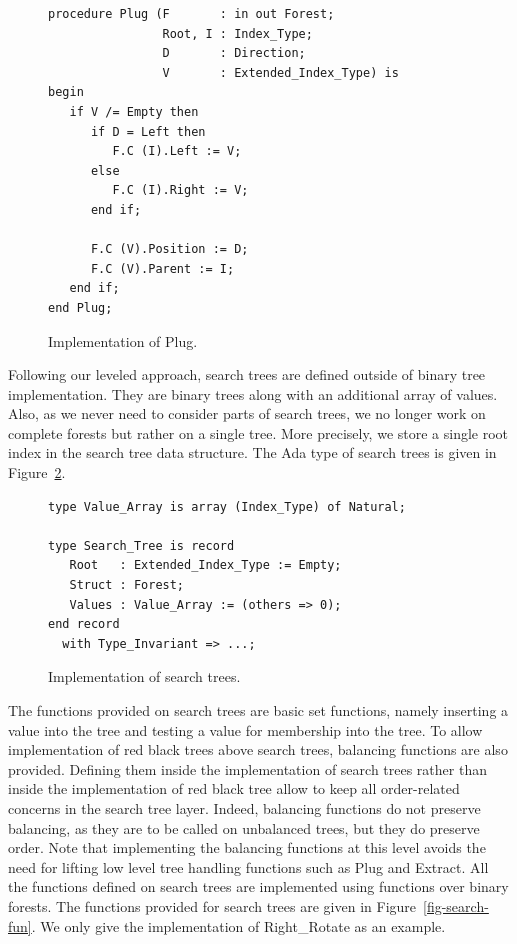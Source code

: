 \documentclass[11pt,a4paper]{article}
\begin{document}
\begin{figure}[ht]
\begin{small}
\begin{lstlisting}
procedure Plug (F       : in out Forest;
                Root, I : Index_Type;
                D       : Direction;
                V       : Extended_Index_Type) is
begin
   if V /= Empty then
      if D = Left then
         F.C (I).Left := V;
      else
         F.C (I).Right := V;
      end if;

      F.C (V).Position := D;
      F.C (V).Parent := I;
   end if;
end Plug;
\end{lstlisting}
\end{small}
\caption{\label{fig-binary-body} Implementation of Plug.}
\end{figure}

Following our leveled approach, search trees are defined outside of binary tree implementation.
They are binary trees along with an additional array of values. Also, as we never need to consider
parts of search trees, we no longer work on complete forests but rather on a single tree. More
precisely, we store a single root index in the search tree data structure.
The Ada type of search trees is given in Figure~\ref{fig-search-typ}.

\begin{figure}[ht]
\begin{small}
\begin{lstlisting}
type Value_Array is array (Index_Type) of Natural;

type Search_Tree is record
   Root   : Extended_Index_Type := Empty;
   Struct : Forest;
   Values : Value_Array := (others => 0);
end record
  with Type_Invariant => ...;
\end{lstlisting}
\end{small}
\caption{\label{fig-search-typ} Implementation of search trees.}
\end{figure}

The functions provided on search trees are basic set functions, namely inserting a value into the tree
and testing a value for membership into the tree. To allow implementation of red black trees above
search trees, balancing functions are also provided. Defining them inside the implementation of
search trees rather than inside the implementation of red black tree allow to keep all order-related
concerns in the search tree layer. Indeed, balancing functions do not preserve balancing, as they
are to be called on unbalanced trees, but they do preserve order. Note that implementing the balancing
functions at this level avoids the need for lifting low level tree handling functions such as Plug and
Extract. All the functions defined on search trees are implemented using
functions over binary forests. The functions provided for search trees are given in
Figure~\ref{fig-search-fun}. We only give the implementation of Right\_Rotate as an
example.
\end{document}
